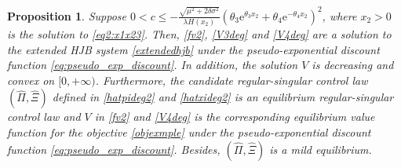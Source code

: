 \documentclass[11pt,reqno]{article}%
\newtheorem{proposition}[theorem]{Proposition}
\numberwithin{equation}{section}
\begin{document}
\begin{proposition}\label{cdeg2}
Suppose $0<c\le -\frac{\sqrt{\mu^2 + 2 \delta \sigma^2}}{\lambda H(x_2) }\left(\theta_{3} \mathrm{e}^{\theta_{3}x_2}+\theta_{4}\mathrm{e}^{-\theta_{4}x_2}\right)^2$, where $x_2>0$ is the solution to \eqref{eq2:x1x23}. Then, \eqref{fv2}, \eqref{V3deg} and \eqref{V4deg} are a solution to the extended HJB system \eqref{extendedhjb} under the pseudo-exponential discount function \eqref{eq:pseudo_exp_discount}. In addition, the solution $V$ is decreasing and convex on $[0,+\infty)$. Furthermore, the candidate regular-singular control law $\left(\hat\Pi,\hat\Xi\right)$ defined in \eqref{hatpideg2} and \eqref{hatxideg2} is an equilibrium regular-singular control law and $V$ in \eqref{fv2} and \eqref{V4deg} is the corresponding equilibrium value function for the objective \eqref{objexmple} under the pseudo-exponential discount function \eqref{eq:pseudo_exp_discount}. Besides, $\left(\hat\Pi,\hat\Xi\right)$ is a mild equilibrium.

\end{proposition}
\end{document}
